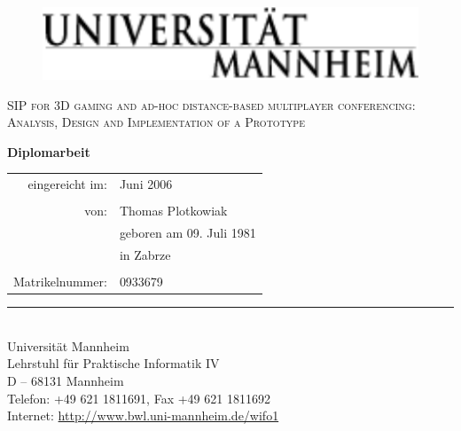 
\begin{titlepage}

\begin{center} %

  \begin{figure}[ht]
    \centering
    \includegraphics{grafiken/unilogo}
  \end{figure}
  
  \bigskip
  \vfill 
  \begin{framed}
    \begin{center}
      \textsc{{\Large SIP for 3D gaming and ad-hoc distance-based multiplayer conferencing: Analysis, Design and Implementation of a Prototype\\}}
  
      \bigskip
  
      \textbf{Diplomarbeit}
    \end{center}
    \end{framed}
    \vfill
    \vfill
  
  \begin{tabular*}{0.62\textwidth}{r@{\extracolsep{\fill}}l}
    eingereicht im: & Juni 2006\\\\
    von: & Thomas Plotkowiak\\
    & geboren am 09. Juli 1981\\
    & in Zabrze\\
    \\
    Matrikelnummer: & 0933679\\
  \end{tabular*}
  \vfill
  \vfill
  
  
  \rule{\textwidth}{.4pt}\\ %
  Universit{\"a}t Mannheim\\
  Lehrstuhl f{\"u}r Praktische Informatik IV\\
  D -- 68131 Mannheim\\
  Telefon: +49 621 1811691, Fax +49 621 1811692\\
  Internet: \url{http://www.bwl.uni-mannheim.de/wifo1}
\end{center}

\end{titlepage} %

